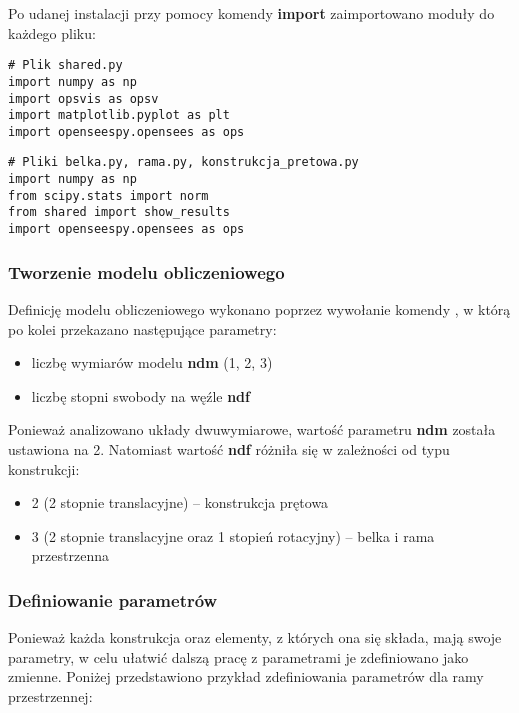 Po udanej instalacji przy pomocy komendy \textbf{import} zaimportowano moduły do każdego pliku:

\begin{lstlisting}
# Plik shared.py
import numpy as np
import opsvis as opsv
import matplotlib.pyplot as plt
import openseespy.opensees as ops
\end{lstlisting}

\begin{lstlisting}
# Pliki belka.py, rama.py, konstrukcja_pretowa.py
import numpy as np
from scipy.stats import norm
from shared import show_results
import openseespy.opensees as ops
\end{lstlisting}

\subsubsection{Tworzenie modelu obliczeniowego}

Definicję modelu obliczeniowego wykonano poprzez wywołanie komendy
, w którą po kolei przekazano następujące parametry:

\begin{itemize}
    \item liczbę wymiarów modelu \textbf{ndm} (1, 2, 3)
    \item liczbę stopni swobody na węźle \textbf{ndf}
\end{itemize}

Ponieważ analizowano układy dwuwymiarowe, wartość parametru \textbf{ndm} została ustawiona na 2.
Natomiast wartość \textbf{ndf} różniła się w zależności od typu konstrukcji:

\begin{itemize}
    \item 2 (2 stopnie translacyjne) – konstrukcja prętowa
    \item 3 (2 stopnie translacyjne oraz 1 stopień rotacyjny) – belka i rama przestrzenna
\end{itemize}

\subsubsection{Definiowanie parametrów}

Ponieważ każda konstrukcja oraz elementy, z których ona się składa, mają swoje parametry, w celu ułatwić dalszą pracę z parametrami
je zdefiniowano jako zmienne.
Poniżej przedstawiono przykład zdefiniowania parametrów dla ramy przestrzennej:

